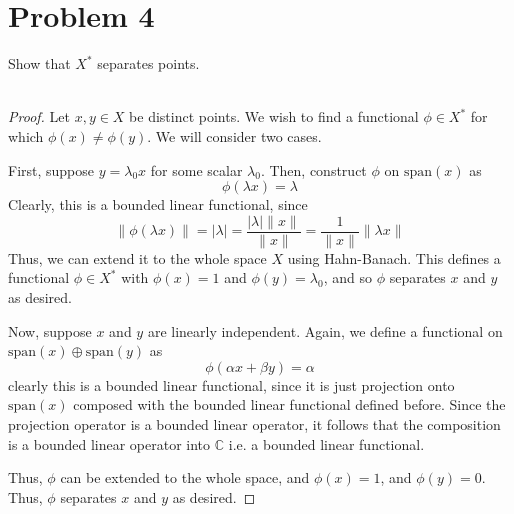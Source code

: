 \documentclass[fontsize=11pt]{scrartcl} %
\numberwithin{equation}{section} %
\numberwithin{figure}{section} %
\numberwithin{table}{section} %
\newcommand{\C}{\mathbb{C}}
\begin{document}
\section*{Problem 4}
Show that $X^*$ separates points.
\\
\\
\begin{proof}
    Let $x,y\in X$ be distinct points. We wish to find a functional $\phi\in
    X^*$ for which $\phi(x)\neq \phi(y)$. We will consider two cases.
    
    First, suppose $y = \lambda_0 x$ for some scalar $\lambda_0$. Then, construct
    $\phi$ on $\text{span}(x)$ as
    \[
        \phi(\lambda x) = \lambda
    \]
    Clearly, this is a bounded linear functional, since 
    \[
        \|\phi(\lambda x)\| =
    |\lambda| = \frac{|\lambda|\|x\|}{\|x\|} = \frac{1}{\|x\|}\|\lambda x\|
\]
    Thus, we can extend it to the whole space $X$ using Hahn-Banach. This
    defines a functional $\phi\in X^*$ with $\phi(x) = 1$ and $\phi(y) =
    \lambda_0$, and so $\phi$ separates $x$ and $y$ as desired.

    Now, suppose $x$ and $y$ are linearly independent. Again, we define a
    functional on $\text{span}(x)\oplus\text{span}(y)$ as 
    \[
        \phi(\alpha x + \beta y) = \alpha
    \]
    clearly this is a bounded linear functional, since it is just projection
    onto $\text{span}(x)$ composed with the bounded linear functional defined
    before. Since the projection operator is a bounded linear operator, it
    follows that the composition is a bounded linear operator into $\C$ i.e. a
    bounded linear functional.

    Thus, $\phi$ can be extended to the whole space, and $\phi(x) = 1$, and
    $\phi(y) = 0$. Thus, $\phi$ separates $x$ and $y$ as desired.
\end{proof}
\end{document}
